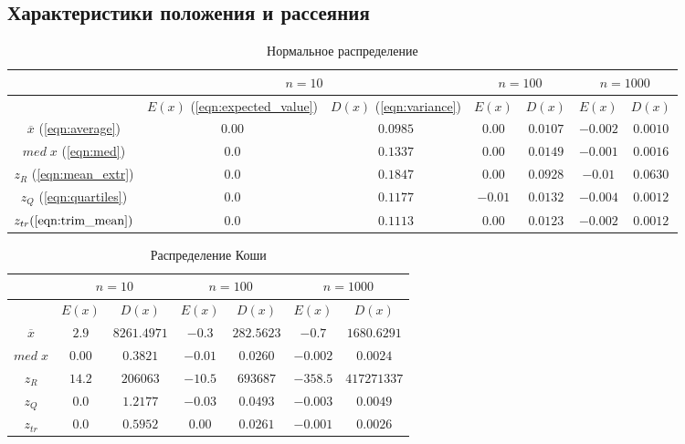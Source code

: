 \documentclass[12pt,a4paper]{article}
\begin{document}
	\subsection{Характеристики положения и рассеяния}
		\begin{table}[H]
			\begin{center}
				\begin{tabular}{|c|c|c|c|c|c|c|}
					\hline
					& \multicolumn{2}{c|}{$n=10$} & \multicolumn{2}{c|}{$n=100$} & \multicolumn{2}{c|}{$n=1000$}\\
					\hline
					& $E(x)$ (\ref{eqn:expected_value}) & $D(x)$ (\ref{eqn:variance}) & $E(x)$ & $D(x)$ & $E(x)$ & $D(x)$\\
					\hline
					$\overline{x}$ (\ref{eqn:average}) & $0.00$ & $0.0985$ & $0.00$ & $0.0107$ & $-0.002$ & $0.0010$\\
					\hline
					$med\;x$ (\ref{eqn:med}) & $0.0$ & $0.1337$ & $0.00$ & $0.0149$ & $-0.001$ & $0.0016$\\
					\hline
					$z_R$ (\ref{eqn:mean_extr}) & $0.0$ & $0.1847$ & $0.00$ & $0.0928$ & $-0.01$ & $0.0630$\\
					\hline
					$z_Q$ (\ref{eqn:quartiles}) & $0.0$ & $0.1177$ & $-0.01$ & $0.0132$ & $-0.004$ & $0.0012$\\
					\hline
					$z_{tr} (\ref{eqn:trim_mean}) $ & $0.0$ & $0.1113$ & $0.00$ & $0.0123$ & $-0.002$ & $0.0012$\\
					\hline
				\end{tabular}
			\end{center}
			\caption{Нормальное распределение}
		\end{table}
		
		\begin{table}[H]
			\begin{center}
				\begin{tabular}{|c|c|c|c|c|c|c|}
					\hline
					& \multicolumn{2}{c|}{$n=10$} & \multicolumn{2}{c|}{$n=100$} & \multicolumn{2}{c|}{$n=1000$}\\
					\hline
					& $E(x)$ & $D(x)$ & $E(x)$ & $D(x)$ & $E(x)$ & $D(x)$\\
					\hline
					$\overline{x}$ & $2.9$ & $8261.4971$ & $-0.3$ & $282.5623$ & $-0.7$ & $1680.6291$\\
					\hline
					$med\;x$ & $0.00$ & $0.3821$ & $-0.01$ & $0.0260$ & $-0.002$ & $0.0024$\\
					\hline
					$z_R$ & $14.2$ & $206063$ & $-10.5$ & $693687$ & $-358.5$ & $417271337$\\
					\hline
					$z_Q$ & $0.0$ & $1.2177$ & $-0.03$ & $0.0493$ & $-0.003$ & $0.0049$\\
					\hline
					$z_{tr}$ & $0.0$ & $0.5952$ & $0.00$ & $0.0261$ & $-0.001$ & $0.0026$\\
					\hline
				\end{tabular}
			\end{center}
			\caption{Распределение Коши}
		\end{table}
		
\end{document}
